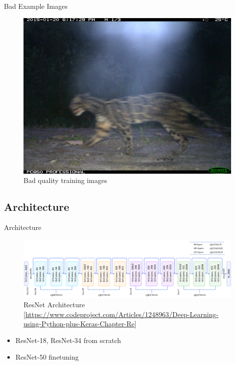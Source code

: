 \documentclass[10pt]{beamer}
\begin{document}
\begin{frame}{Bad Example Images}
\begin{minipage}[c]{0.48\linewidth}
\begin{figure}
			\includegraphics[width=\linewidth,height=\textheight,keepaspectratio]{images/example_bad_DFR_9_female.JPG}
			\caption{Bad quality training images}	
		\end{figure}
	\end{minipage}


\end{frame}

\subsection{Architecture}

\begin{frame}{Architecture}
	\begin{figure}
		\includegraphics[width=\columnwidth]{images/resnet.png}
		\caption{ResNet Architecture\newline{} [\url{https://www.codeproject.com/Articles/1248963/Deep-Learning-using-Python-plus-Keras-Chapter-Re}]}
	\end{figure}

	\begin{itemize}
		\item ResNet-18, ResNet-34 from scratch
		\item ResNet-50 finetuning
	\end{itemize}
\end{frame}
\end{document}
